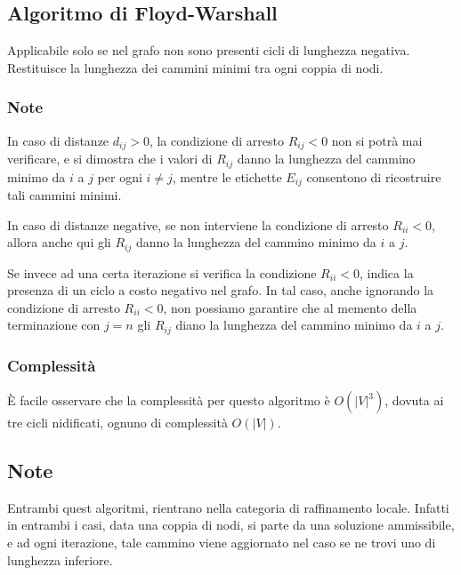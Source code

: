 \documentclass[../template]{subfiles}
\begin{document}
\subsection{Algoritmo di Floyd-Warshall}
Applicabile solo se nel grafo non sono presenti cicli di lunghezza negativa. Restituisce la lunghezza dei cammini minimi tra ogni
coppia di nodi.


\subsubsection{Note}
In caso di distanze $d_{ij} > 0$, la condizione di arresto $R_{ij} < 0$ non si potrà mai verificare, e si dimostra che i valori di
$R_{ij}$ danno la lunghezza del cammino minimo da $i$ a $j$ per ogni $i \neq j$, mentre le etichette $E_{ij}$ consentono di ricostruire tali
cammini minimi.

In caso di distanze negative, se non interviene la condizione di arresto $R_{ii} < 0$, allora anche qui gli $R_{ij}$ danno la lunghezza del
cammino minimo da $i$ a $j$.

Se invece ad una certa iterazione si verifica la condizione $R_{ii} < 0$, indica la presenza di un ciclo a costo negativo nel grafo. In tal caso,
anche ignorando la condizione di arresto $R_{ii} < 0$, non possiamo garantire che al memento della terminazione con $j = n$ gli $R_{ij}$ diano la lunghezza del cammino minimo da $i$ a $j$.

\subsubsection{Complessità}
È facile osservare che la complessità per questo algoritmo è $O(|V|^3)$, dovuta ai tre cicli nidificati, ognuno di complessità $O(|V|)$.
\subsection{Note}
Entrambi quest algoritmi, rientrano nella categoria di raffinamento locale. Infatti in entrambi i casi, data una coppia di nodi, si
parte da una soluzione ammissibile, e ad ogni iterazione, tale cammino viene aggiornato nel caso se ne trovi uno di lunghezza inferiore.
\end{document}
